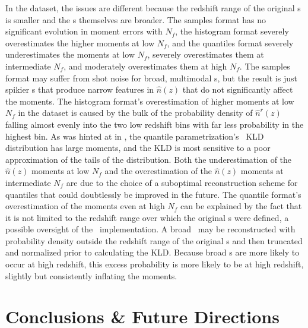 In the \ssdata dataset, the issues are different because the redshift range of 
the original \pz s is smaller and the \pz s themselves are broader.
The samples format has no significant evolution in moment errors with $N_{f}$, 
the histogram format severely overestimates the higher moments at low $N_{f}$, 
and the quantiles format severely underestimates the moments at low $N_{f}$, 
severely overestimates them at intermediate $N_{f}$, and moderately 
overestimates them at high $N_{f}$.
The samples format may suffer from shot noise for broad, multimodal \pz s, but 
the result is just spikier \pz s that produce narrow features in $\hat{n}(z)$ 
that do not significantly affect the moments.
The histogram format's overestimation of higher moments at low $N_{f}$ in the 
\ssdata dataset is caused by the bulk of the probability density of 
$\hat{n}^{r}(z)$ falling almost evenly into the two low redshift bins with far 
less probability in the highest bin.
As was hinted at in , the quantile 
parametrization's \pz\ KLD distribution has large moments, and the KLD is most 
sensitive to a poor approximation of the tails of the distribution.
Both the underestimation of the $\hat{n}(z)$ moments at low $N_{f}$ and the 
overestimation of the $\hat{n}(z)$ moments at intermediate $N_{f}$ are due to 
the choice of a suboptimal reconstruction scheme for quantiles that could 
doubtlessly be improved in the future.
The quantile format's overestimation of the moments even at high $N_{f}$ can be 
explained by the fact that it is not limited to the redshift range over which 
the original \pz s were defined, a possible oversight of the \qp\ 
implementation.
A broad \pz\ may be reconstructed with probability density outside the redshift 
range of the original \pz s and then truncated and normalized prior to 
calculating the KLD.
Because broad \pz s are more likely to occur at high redshift, this excess 
probability is more likely to be at high redshift, slightly but consistently 
inflating the moments.


\section{Conclusions \& Future Directions}

